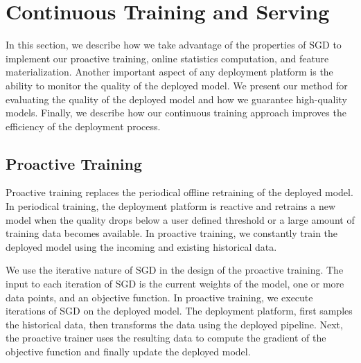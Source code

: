 \section{Continuous Training and Serving} \label{continuous-training-serving}
In this section, we describe how we take advantage of the properties of SGD to implement our proactive training, online statistics computation, and feature materialization.
Another important aspect of any deployment platform is the ability to monitor the quality of the deployed model.
We present our method for evaluating the quality of the deployed model and how we guarantee high-quality models.
Finally, we describe how our continuous training approach improves the efficiency of the deployment process.
\subsection{Proactive Training} \label{proactive-training}
Proactive training replaces the periodical offline retraining of the deployed model.
In periodical training, the deployment platform is reactive and retrains a new model when the quality drops below a user defined threshold or a large amount of training data becomes available.
In proactive training, we constantly train the deployed model using the incoming and existing historical data.

We use the iterative nature of SGD in the design of the proactive training.
The input to each iteration of SGD is the current weights of the model, one or more data points, and an objective function.
In proactive training, we execute iterations of SGD on the deployed model.
The deployment platform, first samples the historical data, then transforms the data using the deployed pipeline.
Next, the proactive trainer uses the resulting data to compute the gradient of the objective function and finally update the deployed model.

